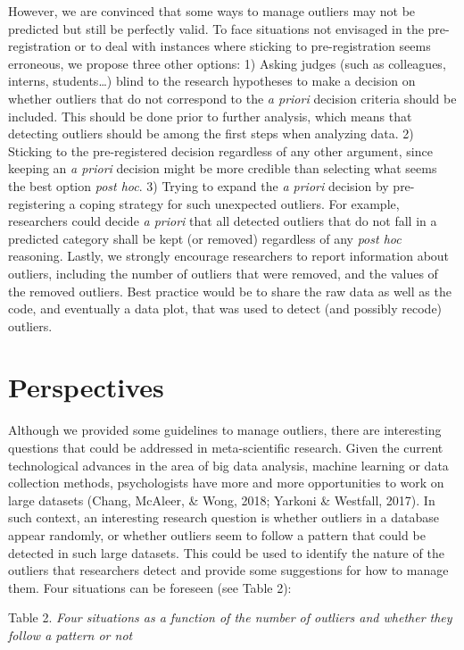 \documentclass[man,floatsintext]{apa6}
\begin{document}
However, we are convinced that some ways to manage outliers may not be predicted but still be perfectly valid. To face situations not envisaged in the pre-registration or to deal with instances where sticking to pre-registration seems erroneous, we propose three other options:
1) Asking judges (such as colleagues, interns, students\ldots{}) blind to the research hypotheses to make a decision on whether outliers that do not correspond to the \emph{a priori} decision criteria should be included. This should be done prior to further analysis, which means that detecting outliers should be among the first steps when analyzing data.
2) Sticking to the pre-registered decision regardless of any other argument, since keeping an \emph{a priori} decision might be more credible than selecting what seems the best option \emph{post hoc}.
3) Trying to expand the \emph{a priori} decision by pre-registering a coping strategy for such unexpected outliers. For example, researchers could decide \emph{a priori} that all detected outliers that do not fall in a predicted category shall be kept (or removed) regardless of any \emph{post hoc} reasoning.
Lastly, we strongly encourage researchers to report information about outliers, including the number of outliers that were removed, and the values of the removed outliers. Best practice would be to share the raw data as well as the code, and eventually a data plot, that was used to detect (and possibly recode) outliers.

\hypertarget{perspectives}{%
\section{Perspectives}\label{perspectives}}

Although we provided some guidelines to manage outliers, there are interesting questions that could be addressed in meta-scientific research. Given the current technological advances in the area of big data analysis, machine learning or data collection methods, psychologists have more and more opportunities to work on large datasets (Chang, McAleer, \& Wong, 2018; Yarkoni \& Westfall, 2017). In such context, an interesting research question is whether outliers in a database appear randomly, or whether outliers seem to follow a pattern that could be detected in such large datasets. This could be used to identify the nature of the outliers that researchers detect and provide some suggestions for how to manage them. Four situations can be foreseen (see Table 2):

Table 2.
\emph{Four situations as a function of the number of outliers and whether they follow a pattern or not}
\end{document}
